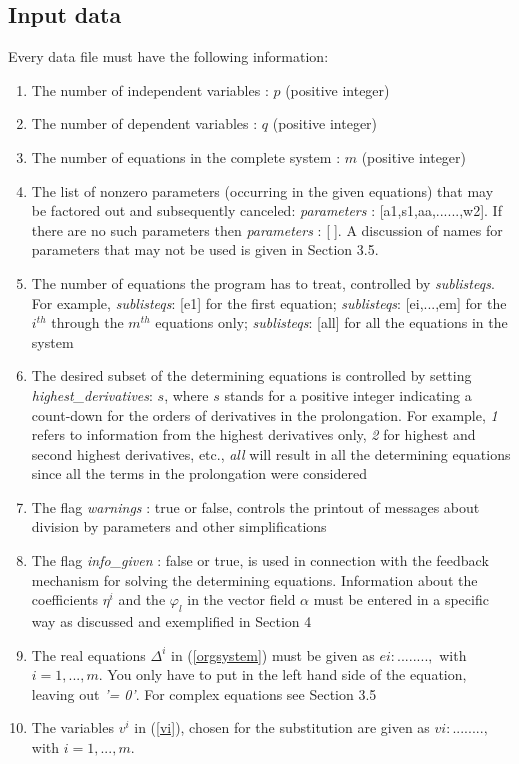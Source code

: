 {\subsection{Input data}
Every data file must have the following information:
\begin{enumerate}
\item The number of independent variables : $p$ (positive integer)
\item The number of dependent variables : $q$ (positive integer)
\item  The number of equations in the complete system : $m$ (positive integer)
\item The list of nonzero parameters (occurring in the given equations) that 
may be factored out and subsequently canceled: 
{\em parameters} : [a1,s1,aa,......,w2].
If there are no such parameters then {\em parameters} : [$\;$]. 
A discussion of names for parameters that may not be used is given
in Section 3.5.
\item The number of equations the program has to treat, controlled by
{\em sublisteqs}. 
For example, {\em sublisteqs}: [e1] for the first equation;
{\em sublisteqs}: [ei,...,em] for the 
$i^{th}$ through the $m^{th}$ equations only; 
{\em sublisteqs}: [all] for all the equations in the system

\pagebreak
\item The desired subset of the determining equations is controlled by
setting {\em highest\_derivatives}: $s$, where
$s$ stands for a positive integer indicating a count-down for the orders 
of derivatives in the prolongation. For example,
{\em 1} refers to information from the highest derivatives
only, {\em 2} for highest and second highest derivatives, etc., 
{\em all} will result in all the determining equations since all the 
terms in the prolongation were considered
\item The flag {\em warnings} : true or false,
controls the printout of messages about division by parameters 
and other simplifications 
\item The flag {\em info\_given }: false or true,
is used in connection with the feedback mechanism for solving the 
determining equations.
Information about the coefficients $\eta^i$ and the $\varphi_l$ 
in the vector field $\alpha$ must be entered in a specific way as 
discussed and exemplified in Section 4
\item The real equations $\Delta^i$ in (\ref{orgsystem})
must be given as $ei: ........ , $
with $ i = 1, ... , m $. You only have to put in the left hand side of the
equation, leaving out {\em '= 0'}. For complex equations see Section 3.5
\item The variables $v^i$ in (\ref{vi}), 
chosen for the substitution are given as $vi: ........, $
with $i = 1, ... , m. $
\end{enumerate}

}

